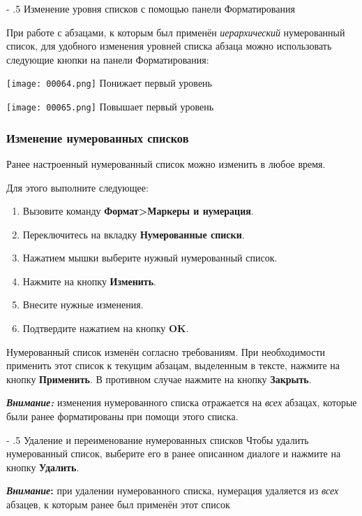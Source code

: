 \documentclass[a4paper,10pt]{article}
\makeatletter
\renewcommand\paragraph{%
   \@startsection{paragraph}{4}{0mm}%
      {-\baselineskip}%
      {.5\baselineskip}%
      {\normalfont\normalsize\bfseries}}
\makeatother
\begin{document}
\paragraph{Изменение уровня списков с помощью панели Форматирования}

При работе с абзацами, к которым был применён \textit{иерархический} нумерованный список, для удобного изменения уровней списка абзаца можно использовать следующие кнопки на панели Форматирования:

\texttt{[image: 00064.png]} Понижает первый уровень

\texttt{[image: 00065.png]} Повышает первый уровень

\subsubsection{Изменение нумерованных списков}
Ранее настроенный нумерованный список можно изменить в любое время.

Для этого выполните следующее:
\begin{enumerate}
 \item Вызовите команду \textbf{Формат>Маркеры и нумерация}.
 \item Переключитесь на вкладку \textbf{Нумерованные списки}.
 \item Нажатием мышки выберите нужный нумерованный список.
 \item Нажмите на кнопку \textbf{Изменить}.
 \item Внесите нужные изменения.
 \item Подтвердите нажатием на кнопку \textbf{OK}.
\end{enumerate}

Нумерованный список изменён согласно требованиям. При необходимости применить этот список к текущим абзацам, выделенным в тексте, нажмите на кнопку \textbf{Применить}. В противном случае нажмите на кнопку \textbf{Закрыть}.

\textbf{\textit{Внимание:}} изменения нумерованного списка отражается на \textit{всех} абзацах, которые были ранее форматированы при помощи этого списка.

\paragraph{Удаление и переименование нумерованных списков}
Чтобы удалить нумерованный список, выберите его в ранее описанном диалоге и нажмите на кнопку \textbf{Удалить}.
\begin{mdframed}[backgroundcolor=blue!10]
\textbf{\textit{Внимание}:} при удалении нумерованного списка, нумерация удаляется из \textit{всех} абзацев, к которым ранее был применён этот список
\end{mdframed}
\end{document}
